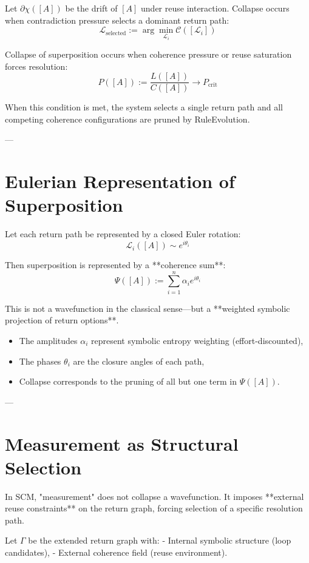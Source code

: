 Let $\partial \chi([A])$ be the drift of $[A]$ under reuse interaction. Collapse occurs when contradiction pressure selects a dominant return path:
\[
\mathcal{L}_\text{selected} := \arg\min_{\mathcal{L}_i} \mathcal{C}([\mathcal{L}_i])
\]

\begin{definition}
Collapse of superposition occurs when coherence pressure or reuse saturation forces resolution:
\[
P([A]) := \frac{L([A])}{C([A])} \to P_{\text{crit}}
\]
\end{definition}

When this condition is met, the system selects a single return path and all competing coherence configurations are pruned by RuleEvolution.

---

\section{Eulerian Representation of Superposition}

Let each return path be represented by a closed Euler rotation:
\[
\mathcal{L}_i([A]) \sim e^{i\theta_i}
\]

Then superposition is represented by a **coherence sum**:
\[
\Psi([A]) := \sum_{i=1}^n \alpha_i e^{i\theta_i}
\]

This is not a wavefunction in the classical sense—but a **weighted symbolic projection of return options**.

\begin{itemize}
  \item The amplitudes $\alpha_i$ represent symbolic entropy weighting (effort-discounted),
  \item The phases $\theta_i$ are the closure angles of each path,
  \item Collapse corresponds to the pruning of all but one term in $\Psi([A])$.
\end{itemize}

---

\section{Measurement as Structural Selection}

In SCM, "measurement" does not collapse a wavefunction. It imposes **external reuse constraints** on the return graph, forcing selection of a specific resolution path.

Let $\Gamma$ be the extended return graph with:
- Internal symbolic structure (loop candidates),
- External coherence field (reuse environment).


